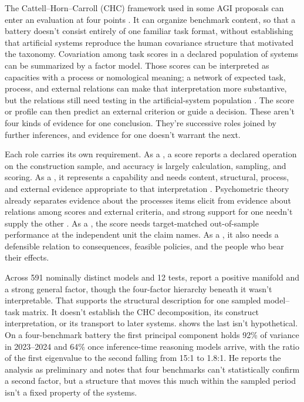 \documentclass[12pt]{article}
\begin{document}
The Cattell--Horn--Carroll (CHC) framework used in some AGI proposals can enter an evaluation at four points \citep{carroll1993human,mcgrew2009chc,schneider2018chc,hendrycks2025agi}. It can organize benchmark content, so that a battery doesn't consist entirely of one familiar task format, without establishing that artificial systems reproduce the human covariance structure that motivated the taxonomy. Covariation among task scores in a declared population of systems can be summarized by a factor model. Those scores can be interpreted as capacities with a process or nomological meaning; a network of expected task, process, and external relations can make that interpretation more substantive, but the relations still need testing in the artificial-system population \citep{cronbach1955construct,freiesleben2026establishing}. The score or profile can then predict an external criterion or guide a decision. These aren't four kinds of evidence for one conclusion. They're successive roles joined by further inferences, and evidence for one doesn't warrant the next.

Each role carries its own requirement. As a , a score reports a declared operation on the construction sample, and accuracy is largely calculation, sampling, and scoring. As a , it represents a capability and needs content, structural, process, and external evidence appropriate to that interpretation \citep{messick1995Validity,borsboom2004conceptValidity}. Psychometric theory already separates evidence about the processes items elicit from evidence about relations among scores and external criteria, and strong support for one needn't supply the other \citep[180]{embretson1983construct}. As a , the score needs target-matched out-of-sample performance at the independent unit the claim names. As a , it also needs a defensible relation to consequences, feasible policies, and the people who bear their effects.

Across 591 nominally distinct models and 12 tests, \textcite[4--5]{ilicGignac2024cognitiveCapabilities} report a positive manifold and a strong general factor, though the four-factor hierarchy beneath it wasn't interpretable. That supports the structural description for one sampled model--task matrix. It doesn't establish the CHC decomposition, its construct interpretation, or its transport to later systems. \Textcite{krakauer2026riseFall} shows the last isn't hypothetical. On a four-benchmark battery the first principal component holds 92\% of variance in 2023--2024 and 64\% once inference-time reasoning models arrive, with the ratio of the first eigenvalue to the second falling from 15:1 to 1.8:1. He reports the analysis as preliminary and notes that four benchmarks can't statistically confirm a second factor, but a structure that moves this much within the sampled period isn't a fixed property of the systems.
\end{document}
